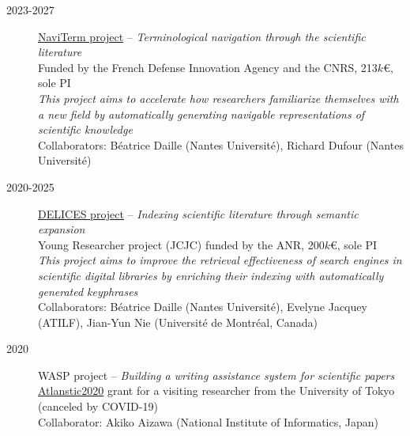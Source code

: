 \begin{description}

    \item[2023-2027] \href{https://cnrs-naviterm.github.io/}{NaviTerm project} --
                    \emph{Terminological navigation through the scientific literature} \\
                    Funded by the French Defense Innovation Agency and the CNRS, 213$k$€, sole PI \\[.1em]
                    \emph{This project aims to accelerate how researchers familiarize themselves with a new field by automatically generating navigable representations of scientific knowledge}\\[.1em]
                    Collaborators: Béatrice Daille (Nantes Université), Richard Dufour (Nantes Université)

    \item[2020-2025] \href{https://anr-delices.github.io/}{DELICES project} --
                    \emph{Indexing scientific literature through semantic expansion} \\
                    Young Researcher project (JCJC) funded by the ANR, 200$k$€, sole PI \\[.1em]
                    \emph{This project aims to improve the retrieval effectiveness of search engines in scientific digital libraries by enriching their indexing with automatically generated keyphrases}\\[.1em]
                    Collaborators: Béatrice Daille (Nantes Université), Evelyne Jacquey (ATILF), Jian-Yun Nie (Université de Montréal, Canada)

    \item[2020] WASP project --
                \emph{Building a writing assistance system for scientific papers} \\
                 \href{https://Atlanstic2020.fr/}{Atlanstic2020} grant for a visiting researcher from the University of Tokyo (canceled by COVID-19) \\
                 Collaborator: Akiko Aizawa (National Institute of Informatics, Japan)
                 

\end{description}
